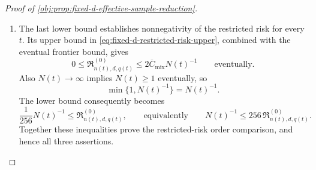 \documentclass[11pt]{article}
\begin{document}
\begin{proof}[Proof of \cref{obj:prop:fixed-d-effective-sample-reduction}]
\begin{enumerate}
The estimator class is nonempty: the constant kernel
\[
\mathsf T^{0}(o,dh):=\operatorname{Dirac}_{0}(dh)
\]
is admissible. Moreover, binary potential outcomes imply
\(\tau(P)\in[-1,1]\), and the kernel outputs lie in \([-1,1]\), so
\[
0\le E_P[(\mathsf T-\tau(P))^2]\le4
\]
for every full-data law \(P\) and admissible \(\mathsf T\).
Both testing laws belong to the full model and to its restricted subclass.
Their maximum risk therefore bounds each corresponding worst-case risk
from below; the uniform bound by \(4\) ensures these suprema are finite.
Taking the infimum over estimators gives
\[
\frac1{256}\min\{1,N(t)^{-1}\}
\le
\mathfrak R_{n(t),d,q(t)},
\qquad
\frac1{256}\min\{1,N(t)^{-1}\}
\le
\mathfrak R^{(0)}_{n(t),d,q(t)}.
\]

\item The last lower bound establishes nonnegativity of the restricted risk
for every \(t\). Its upper bound in \cref{eq:fixed-d-restricted-risk-upper}, combined with the eventual
frontier bound, gives
\[
0\le
\mathfrak R^{(0)}_{n(t),d,q(t)}
\le
2\overline C_{\mathrm{mix}}N(t)^{-1}
\qquad\text{eventually}.
\]
Also \(N(t)\to\infty\) implies \(N(t)\ge1\) eventually, so
\[
\min\{1,N(t)^{-1}\}=N(t)^{-1}.
\]
The lower bound consequently becomes
\[
\frac1{256}N(t)^{-1}
\le
\mathfrak R^{(0)}_{n(t),d,q(t)},
\qquad\text{equivalently}\qquad
N(t)^{-1}\le256\,\mathfrak R^{(0)}_{n(t),d,q(t)}.
\]
Together these inequalities prove the restricted-risk order comparison,
and hence all three assertions.
\end{enumerate}
\end{proof}
\end{document}
